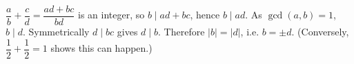 $\dfrac ab+\dfrac cd=\dfrac{ad+bc}{bd}$ is an integer, so $b\mid ad+bc$, hence $b\mid ad$. As $\gcd(a,b)=1$, $b\mid d$. Symmetrically $d\mid bc$ gives $d\mid b$. Therefore $\boxed{|b|=|d|}$, i.e. $b=\pm d$. (Conversely, $\dfrac12+\dfrac12=1$ shows this can happen.)
